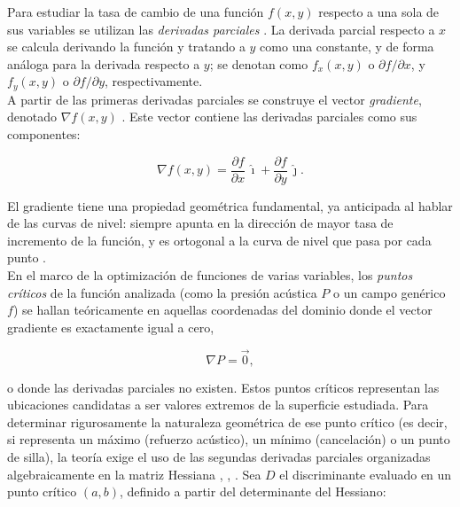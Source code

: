 Para estudiar la tasa de cambio de una función \(f(x,y)\) respecto a una
sola de sus variables se utilizan las \emph{derivadas parciales}
\cite{apostol,larson2015,stewart2018}. La derivada parcial respecto
a \(x\) se calcula derivando la función y tratando a \(y\) como una
constante, y de forma análoga para la derivada respecto a \(y\); se
denotan como \(f_x(x,y)\) o \(\partial f/\partial x\), y \(f_y(x,y)\) o
\(\partial f/\partial y\), respectivamente.\\

A partir de las primeras derivadas parciales se construye el vector
\emph{gradiente}, denotado \(\nabla f(x,y)\)
\cite[pág.~310]{apostol} \cite[pág.~1126]{larson2015}
. Este vector contiene las
derivadas parciales como sus componentes:

\begin{equation}
\nabla f(x,y) = \frac{\partial f}{\partial x}\,\hat{\imath}
              + \frac{\partial f}{\partial y}\,\hat{\jmath}.
\end{equation}

El gradiente tiene una propiedad geométrica fundamental, ya anticipada
al hablar de las curvas de nivel: siempre apunta en la dirección de
mayor tasa de incremento de la función, y es ortogonal a la curva de
nivel que pasa por cada punto \cite{marsden2011,stewart2018}.\\

En el marco de la optimización de funciones de varias variables, los \emph{puntos críticos} de la función analizada (como la presión acústica \(P\) o un campo genérico \(f\)) se hallan teóricamente en aquellas coordenadas del dominio donde el vector gradiente es exactamente igual a cero,

\begin{equation}
\nabla P = \vec{0},
\end{equation}

\noindent o donde las derivadas parciales no existen. Estos puntos críticos representan las ubicaciones candidatas a ser valores extremos de la superficie estudiada. Para determinar rigurosamente la naturaleza geométrica de ese punto crítico (es decir, si representa un máximo (refuerzo acústico), un mínimo (cancelación) o un punto de silla), la teoría exige el uso de las segundas derivadas parciales organizadas algebraicamente en la matriz Hessiana \cite[pág. 196]{marsden2011}, \cite[pág. 946]{stewart2018}, \cite[pág. 378 y 380]{apostol}. Sea \(D\) el discriminante
evaluado en un punto crítico \((a,b)\), definido a partir del
determinante del Hessiano:

